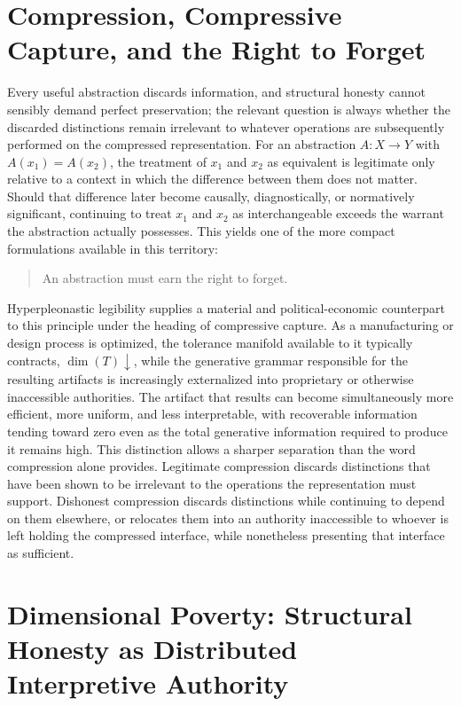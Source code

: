 \documentclass[11pt]{article}
\begin{document}
\section{Compression, Compressive Capture, and the Right to Forget}

Every useful abstraction discards information, and structural honesty cannot sensibly demand perfect preservation; the relevant question is always whether the discarded distinctions remain irrelevant to whatever operations are subsequently performed on the compressed representation. For an abstraction $A: X \to Y$ with $A(x_1) = A(x_2)$, the treatment of $x_1$ and $x_2$ as equivalent is legitimate only relative to a context in which the difference between them does not matter. Should that difference later become causally, diagnostically, or normatively significant, continuing to treat $x_1$ and $x_2$ as interchangeable exceeds the warrant the abstraction actually possesses. This yields one of the more compact formulations available in this territory:

\begin{quote}
An abstraction must earn the right to forget.
\end{quote}

Hyperpleonastic legibility supplies a material and political-economic counterpart to this principle under the heading of compressive capture. As a manufacturing or design process is optimized, the tolerance manifold available to it typically contracts, $\dim(T) \downarrow$, while the generative grammar responsible for the resulting artifacts is increasingly externalized into proprietary or otherwise inaccessible authorities. The artifact that results can become simultaneously more efficient, more uniform, and less interpretable, with recoverable information tending toward zero even as the total generative information required to produce it remains high. This distinction allows a sharper separation than the word compression alone provides. Legitimate compression discards distinctions that have been shown to be irrelevant to the operations the representation must support. Dishonest compression discards distinctions while continuing to depend on them elsewhere, or relocates them into an authority inaccessible to whoever is left holding the compressed interface, while nonetheless presenting that interface as sufficient.

\section{Dimensional Poverty: Structural Honesty as Distributed Interpretive Authority}
\end{document}
